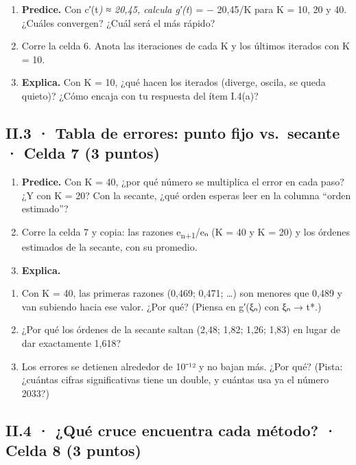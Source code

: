 \begin{enumerate}
\def\labelenumi{(\alph{enumi})}
\item
  \textbf{Predice.} Con c′(t\emph{) ≈ 20,45, calcula \textbar g′(t})\textbar{} =  − 20,45/K\textbar{} para K = 10, 20 y 40. ¿Cuáles convergen? ¿Cuál será el más rápido?
\item
  Corre la celda 6. Anota las iteraciones de cada K y los últimos iterados con K = 10.
\item
  \textbf{Explica.} Con K = 10, ¿qué hacen los iterados (diverge, oscila, se queda quieto)? ¿Cómo encaja con tu respuesta del ítem I.4(a)?
\end{enumerate}

\subsection{II.3 · Tabla de errores: punto fijo vs.~secante · Celda 7 (3 puntos)}

\begin{enumerate}
\def\labelenumi{(\alph{enumi})}
\item
  \textbf{Predice.} Con K = 40, ¿por qué número se multiplica el error en cada paso? ¿Y con K = 20? Con la secante, ¿qué orden esperas leer en la columna ``orden estimado''?
\item
  Corre la celda 7 y copia: las razones e\textsubscript{n+1}/eₙ (K = 40 y K = 20) y los órdenes estimados de la secante, con su promedio.
\item
  \textbf{Explica.}
\end{enumerate}

\begin{enumerate}
\def\labelenumi{\arabic{enumi}.}
\tightlist
\item
  Con K = 40, las primeras razones (0,469; 0,471; \ldots) son menores que 0,489 y van subiendo hacia ese valor. ¿Por qué? (Piensa en g′(ξₙ) con ξₙ → t*.)
\item
  ¿Por qué los órdenes de la secante saltan (2,48; 1,82; 1,26; 1,83) en lugar de dar exactamente 1,618?
\item
  Los errores se detienen alrededor de 10⁻¹² y no bajan más. ¿Por qué? (Pista: ¿cuántas cifras significativas tiene un double, y cuántas usa ya el número 2033?)
\end{enumerate}

\subsection{II.4 · ¿Qué cruce encuentra cada método? · Celda 8 (3 puntos)}

